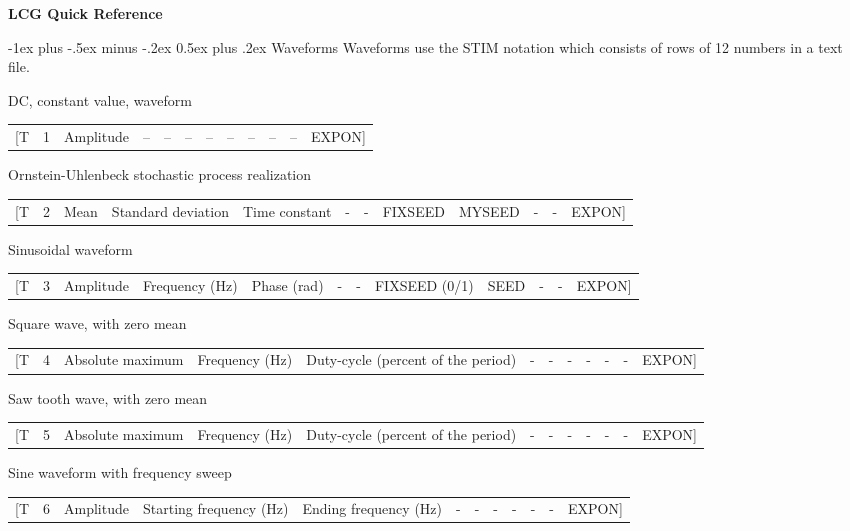 \documentclass[10pt,landscape]{article}
\makeatletter
\renewcommand{\section}{\@startsection{section}{1}{0mm}%
                                {-1ex plus -.5ex minus -.2ex}%
                                {0.5ex plus .2ex}%
                                {\normalfont\large\bfseries}}
\makeatother
\begin{document}
\raggedright
\footnotesize

\begin{center}
     \Large{\textbf{LCG Quick Reference}} \\
\end{center}

\section{Waveforms}
Waveforms use the STIM notation which consists of rows of 12 numbers in a text file.

DC, constant value, waveform\\
\begin{tabular}{rrrrrrrrrrrr}
[T & 1 & Amplitude & -- & -- & -- & -- & -- & -- & -- & -- & EXPON]
\end{tabular}

Ornstein-Uhlenbeck stochastic process realization\\

\begin{tabular}{rrrrrrrrrrrr}
[T & 2 & Mean  & Standard deviation & Time constant & - & - & FIXSEED & MYSEED & - & - & EXPON]
\end{tabular}

Sinusoidal waveform\\

\begin{tabular}{rrrrrrrrrrrr}
[T & 3 & Amplitude & Frequency (Hz) & Phase (rad) & - & - & FIXSEED (0/1) & SEED & - & - & EXPON]
\end{tabular}


Square wave, with zero mean\\

\begin{tabular}{rrrrrrrrrrrr}
[T & 4 & Absolute maximum & Frequency (Hz) & Duty-cycle (percent of the period) & - & - & - & - & - & - & EXPON]
\end{tabular}


Saw tooth wave, with zero mean\\

\begin{tabular}{rrrrrrrrrrrr}
[T & 5 & Absolute maximum & Frequency (Hz) & Duty-cycle (percent of the period) & - & - & - & - & - & - & EXPON]
\end{tabular}


Sine waveform with frequency sweep\\

\begin{tabular}{rrrrrrrrrrrr}
[T & 6 & Amplitude & Starting frequency (Hz) & Ending frequency (Hz) & - & - & - & - & - & - & EXPON]
\end{tabular}
\end{document}
